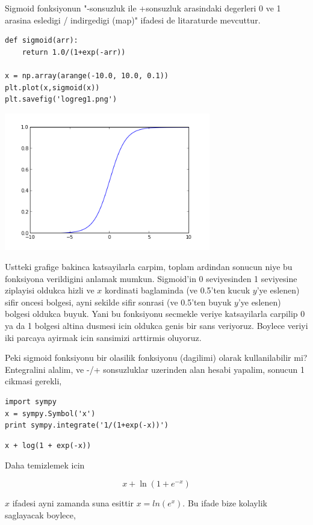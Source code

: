 \documentclass[12pt,fleqn]{article}\usepackage{../common}
\begin{document}
Sigmoid fonksiyonun "-sonsuzluk ile +sonsuzluk arasindaki degerleri 0
ve 1 arasina esledigi / indirgedigi (map)" ifadesi de litaraturde
mevcuttur.

\begin{verbatim}
def sigmoid(arr):
    return 1.0/(1+exp(-arr))

x = np.array(arange(-10.0, 10.0, 0.1))
plt.plot(x,sigmoid(x))
plt.savefig('logreg1.png')
\end{verbatim}

\includegraphics[height=6cm]{logreg1.png}

Ustteki grafige bakinca katsayilarla carpim, toplam ardindan sonucun
niye bu fonksiyona verildigini anlamak mumkun. Sigmoid'in 0
seviyesinden 1 seviyesine ziplayisi oldukca hizli ve $x$ kordinati
baglaminda (ve 0.5'ten kucuk $y$'ye eslenen) sifir oncesi bolgesi,
ayni sekilde sifir sonrasi (ve 0.5'ten buyuk $y$'ye eslenen) bolgesi
oldukca buyuk. Yani bu fonksiyonu secmekle veriye katsayilarla
carpilip 0 ya da 1 bolgesi altina dusmesi icin oldukca genis bir sans
veriyoruz.  Boylece veriyi iki parcaya ayirmak icin sansimizi
arttirmis oluyoruz.


Peki sigmoid fonksiyonu bir olasilik fonksiyonu (dagilimi) olarak
kullanilabilir mi?  Entegralini alalim, ve -/+ sonsuzluklar uzerinden
alan hesabi yapalim, sonucun 1 cikmasi gerekli,

\begin{verbatim}
import sympy
x = sympy.Symbol('x')
print sympy.integrate('1/(1+exp(-x))')
\end{verbatim}

\begin{verbatim}
x + log(1 + exp(-x))
\end{verbatim}

Daha temizlemek icin

$$ x + \ln(1 + e^{-x}) $$

$x$ ifadesi ayni zamanda suna esittir $x=ln( e^{x} )$. Bu ifade bize
kolaylik saglayacak boylece,
\end{document}
